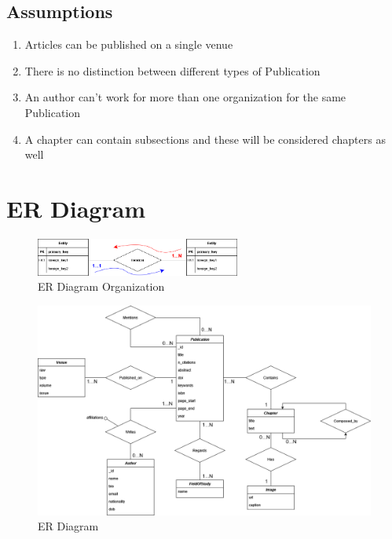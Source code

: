 \documentclass{Configuration_Files/PoliMi3i_thesis}
\begin{document}
\section{Assumptions}
\label{sec:assumptions}
\begin{enumerate}
\item Articles can be published on a single venue
\item There is no distinction between different types of Publication
\item An author can't work for more than one organization for the same Publication
\item A chapter can contain subsections and these will be considered chapters as well
\end{enumerate}

\chapter{ER Diagram}
\label{ch:erd}
\begin{figure}[H]
	\centering
	\includegraphics[width=0.6\textwidth]{legendaER.png}
	\caption{ER Diagram Organization}
	\label{fig:erleg}
\end{figure}
\bigskip
\begin{figure}[H]
	\centering
	\includegraphics[width=1\textwidth]{ERDocDb.png}
	\caption{ER Diagram}
	\label{fig:er}
\end{figure}
\newpage
\end{document}
